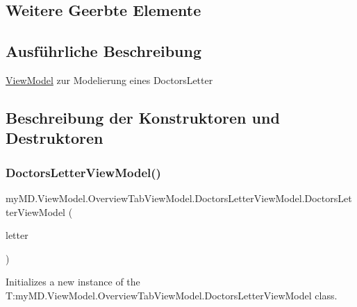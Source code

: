 \subsection*{Weitere Geerbte Elemente}


\subsection{Ausführliche Beschreibung}
\mbox{\hyperlink{namespacemy_m_d_1_1_view_model}{View\+Model}} zur Modelierung eines Doctors\+Letter 



\subsection{Beschreibung der Konstruktoren und Destruktoren}
\mbox{\label{classmy_m_d_1_1_view_model_1_1_overview_tab_view_model_1_1_doctors_letter_view_model_a587e53a436f0a4472d49493bcdc97f9d}} 
\subsubsection{\texorpdfstring{Doctors\+Letter\+View\+Model()}{DoctorsLetterViewModel()}\hspace{0.1cm}{\footnotesize\ttfamily [1/2]}}
{\footnotesize\ttfamily my\+M\+D.\+View\+Model.\+Overview\+Tab\+View\+Model.\+Doctors\+Letter\+View\+Model.\+Doctors\+Letter\+View\+Model (\begin{DoxyParamCaption}\item[{\mbox{\hyperlink{interfacemy_m_d_1_1_model_interface_1_1_data_model_interface_1_1_i_doctors_letter}{I\+Doctors\+Letter}}}]{letter }\end{DoxyParamCaption})}



Initializes a new instance of the T\+:my\+M\+D.\+View\+Model.\+Overview\+Tab\+View\+Model.\+Doctors\+Letter\+View\+Model class. 


